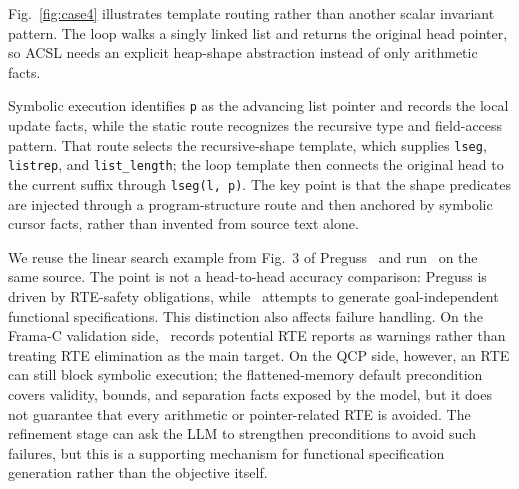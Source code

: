 Fig.~\ref{fig:case4} illustrates template routing rather than another scalar invariant pattern. The loop walks a singly linked list and returns the original head pointer, so ACSL needs an explicit heap-shape abstraction instead of only arithmetic facts.

Symbolic execution identifies \texttt{p} as the advancing list pointer and records the local update facts, while the static route recognizes the recursive type and field-access pattern. That route selects the recursive-shape template, which supplies \texttt{lseg}, \texttt{listrep}, and \texttt{list\_length}; the loop template then connects the original head to the current suffix through \texttt{lseg(l, p)}. The key point is that the shape predicates are injected through a program-structure route and then anchored by symbolic cursor facts, rather than invented from source text alone.

\label{app:case-search}

\DIFaddbegin
We reuse the linear search example from Fig.~3 of Preguss~\cite{Wang2025ATO} and run \toolname\ on the same source. The point is not a head-to-head accuracy comparison: Preguss is driven by RTE-safety obligations, while \toolname\ attempts to generate goal-independent functional specifications. This distinction also affects failure handling. On the Frama-C validation side, \toolname\ records potential RTE reports as warnings rather than treating RTE elimination as the main target. On the QCP side, however, an RTE can still block symbolic execution; the flattened-memory default precondition covers validity, bounds, and separation facts exposed by the model, but it does not guarantee that every arithmetic or pointer-related RTE is avoided. The refinement stage can ask the LLM to strengthen preconditions to avoid such failures, but this is a supporting mechanism for functional specification generation rather than the objective itself.
\DIFaddend

